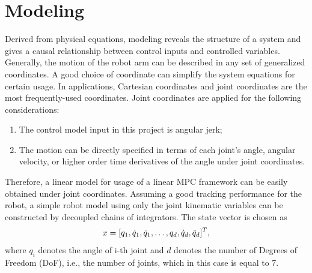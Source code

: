 \documentclass[final]{LTHtwocol} %
\begin{document}
\section{Modeling} \label{sec:modeling}
Derived from physical equations, modeling reveals the structure of a system and gives a causal relationship between control inputs and controlled variables. Generally, the motion of the robot arm can be described in any set of generalized coordinates. A good choice of coordinate can simplify the system equations for certain usage. In applications, Cartesian coordinates and joint coordinates are the most frequently-used coordinates. Joint coordinates are applied for the following considerations:
\begin{enumerate}
    \item The control model input in this project is angular jerk;
    \item The motion can be directly specified in terms of each joint's angle, angular velocity, or higher order time derivatives of the angle under joint coordinates.
\end{enumerate}
Therefore, a linear model for usage of a linear MPC framework can be easily obtained under joint coordinates. Assuming a good tracking performance for the robot, a simple robot model using only the joint kinematic variables can be constructed by decoupled chains of integrators. The state vector is chosen as 
\begin{equation}
    x = [q_1, \dot{q}_1, \Ddot{q}_1, \dots, q_d, \dot{q}_d, \Ddot{q}_d]^T,
\end{equation}
where $q_i$ denotes the angle of i-th joint and $d$ denotes the number of Degrees of Freedom (DoF), i.e., the number of joints, which in this case is equal to 7.

\end{document}
